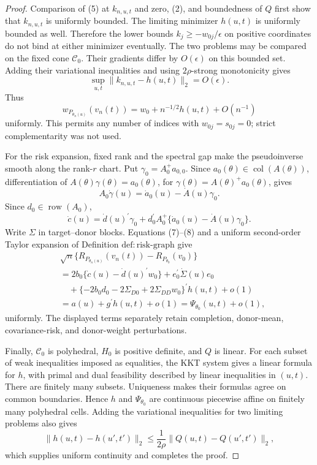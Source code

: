 \documentclass{article}
\begin{document}
\begin{proof}
Comparison of (5) at \(k_{n,u,t}\) and zero, (2), and boundedness of \(Q\) first show that \(k_{n,u,t}\) is uniformly bounded.  The limiting minimizer \(h(u,t)\) is uniformly bounded as well.  Therefore the lower bounds \(k_j\geq-w_{0j}/\epsilon\) on positive coordinates do not bind at either minimizer eventually.  The two problems may be compared on the fixed cone \(\mathcal C_0\).  Their gradients differ by \(O(\epsilon)\) on this bounded set.  Adding their variational inequalities and using \(2\rho\)-strong monotonicity gives
\[
 \sup_{u,t}\lVert k_{n,u,t}-h(u,t)\rVert_2=O(\epsilon).
\tag{6}
\]
Thus
\[
 w_{P_{\theta_n(u)}}(v_n(t))
 =w_0+n^{-1/2}h(u,t)+O(n^{-1})
\tag{7}
\]
uniformly.  This permits any number of indices with \(w_{0j}=s_{0j}=0\); strict complementarity was not used.

For the risk expansion, fixed rank and the spectral gap make the pseudoinverse smooth along the rank-\(r\) chart.  Put \(\gamma_0=A_0^+a_{0,0}\).  Since \(a_0(\theta)\in\operatorname{col}(A(\theta))\), differentiation of \(A(\theta)\gamma(\theta)=a_0(\theta)\), for \(\gamma(\theta)=A(\theta)^+a_0(\theta)\), gives
\[
 A_0\dot\gamma(u)=\dot a_0(u)-\dot A(u)\gamma_0.
\]
Since \(d_0\in\operatorname{row}(A_0)\),
\[
 \dot c(u)
 =\dot d(u)^\prime\gamma_0
 +d_0^\prime A_0^+
   \{\dot a_0(u)-\dot A(u)\gamma_0\}.
\tag{8}
\]
Write \(\Sigma\) in target--donor blocks.  Equations (7)--(8) and a uniform second-order Taylor expansion of Definition \(\mathrm{def:risk\mbox{-}graph}\) give
\[
\begin{aligned}
 &\sqrt n\{R_{P_{\theta_n(u)}}(v_n(t))-R_{P_{\theta_0}}(v_0)\}\\
 &=
 2b_0\{\dot c(u)-\dot d(u)^\prime w_0\}
 +e_0^\prime\dot\Sigma(u)e_0\\
 &\quad
 +\{-2b_0d_0-2\Sigma_{D0}+2\Sigma_{DD}w_0\}^\prime h(u,t)
 +o(1)\\
 &=a(u)+g^\prime h(u,t)+o(1)
 =\Psi_{\theta_0}(u,t)+o(1),
\end{aligned}
\tag{9}
\]
uniformly.  The displayed terms separately retain completion, donor-mean, covariance-risk, and donor-weight perturbations.

Finally, \(\mathcal C_0\) is polyhedral, \(H_0\) is positive definite, and \(Q\) is linear.  For each subset of weak inequalities imposed as equalities, the KKT system gives a linear formula for \(h\), with primal and dual feasibility described by linear inequalities in \((u,t)\).  There are finitely many subsets.  Uniqueness makes their formulas agree on common boundaries.  Hence \(h\) and \(\Psi_{\theta_0}\) are continuous piecewise affine on finitely many polyhedral cells.  Adding the variational inequalities for two limiting problems also gives
\[
 \lVert h(u,t)-h(u',t')\rVert_2
 \leq \frac{1}{2\rho}
 \lVert Q(u,t)-Q(u',t')\rVert_2,
\]
which supplies uniform continuity and completes the proof.
\end{proof}
\end{document}
